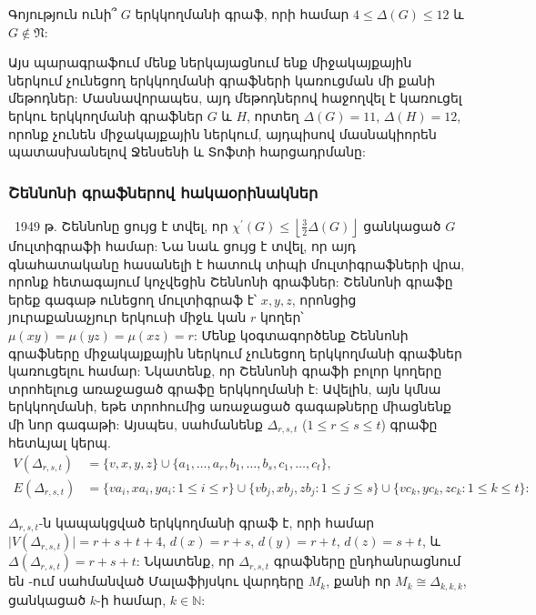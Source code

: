 \begin{problem}
Գոյություն ունի՞ $G$ երկկողմանի գրաֆ, որի համար $4\leq \Delta(G)\leq 12$ և
$G\notin \mathfrak{N}$:
\end{problem}

Այս պարագրաֆում մենք ներկայացնում ենք միջակայքային ներկում չունեցող երկկողմանի գրաֆների կառուցման մի քանի մեթոդներ: Մասնավորապես, այդ մեթոդներով հաջողվել է կառուցել երկու երկկողմանի գրաֆներ $G$ և $H$, որտեղ
$\Delta(G)=11$, $\Delta(H)=12$, որոնք չունեն միջակայքային ներկում, այդպիսով մասնակիորեն պատասխանելով Ջենսենի և Տոֆտի հարցադրմանը:





\subsubsection{Շեննոնի գրաֆներով հակաօրինակներ}\
1949 թ. Շեննոնը \cite{Shannon1949} ցույց է տվել, որ $\chi^{\prime }(G)\leq
\left\lfloor \frac{3}{2}\Delta(G)\right\rfloor$ ցանկացած
$G$ մուլտիգրաֆի համար: Նա նաև ցույց է տվել, որ այդ գնահատականը հասանելի է հատուկ տիպի մուլտիգրաֆների վրա, որոնք հետագայում կոչվեցին Շեննոնի գրաֆներ: Շեննոնի գրաֆը երեք գագաթ ունեցող մուլտիգրաֆ է՝ $x,y,z$, որոնցից յուրաքանաչյուր երկուսի միջև կան $r$ կողեր՝ $\mu (xy)=\mu (yz)=\mu (xz)=r$: Մենք կօգտագործենք Շեննոնի գրաֆները միջակայքային ներկում չունեցող երկկողմանի գրաֆներ կառուցելու համար: Նկատենք, որ Շեննոնի գրաֆի բոլոր կողերը տրոհելուց առաջացած գրաֆը երկկողմանի է: Ավելին, այն կմնա երկկողմանի, եթե տրոհումից առաջացած գագաթները միացնենք մի նոր գագաթի: Այսպես, սահմանենք $\Delta_{r,s,t}$ ($1\leq r\leq s\leq t$)
գրաֆը հետևյալ կերպ.
\begin{align*}
V(\Delta_{r,s,t}) &= \{v,x,y,z\}\cup\{a_{1},\ldots,a_{r},b_{1},\ldots,b_{s},c_{1},\ldots,c_{t}\},\\
E(\Delta_{r,s,t}) &= \{va_{i},xa_{i},ya_{i}:1\leq i\leq r\}\cup
\{vb_{j},xb_{j},zb_{j}:1\leq j\leq s\}\cup
\{vc_{k},yc_{k},zc_{k}:1\leq k\leq t\}:
\end{align*}

$\Delta_{r,s,t}$-ն կապակցված երկկողմանի գրաֆ է, որի համար $\vert
V(\Delta_{r,s,t})\vert=r+s+t+4$, $d(x)=r+s$, $d(y)=r+t$, $d(z)=s+t$,
և $\Delta(\Delta_{r,s,t})=r+s+t$: Նկատենք, որ $\Delta_{r,s,t}$ գրաֆները ընդհանրացնում են \cite{GiaroKubaleMalafiejski1999}-ում սահմանված Մալաֆիյսկու վարդերը $M_{k}$, քանի որ $M_{k}\cong\Delta_{k,k,k}$, ցանկացած $k$-ի համար, $k\in \mathbb{N}$:

